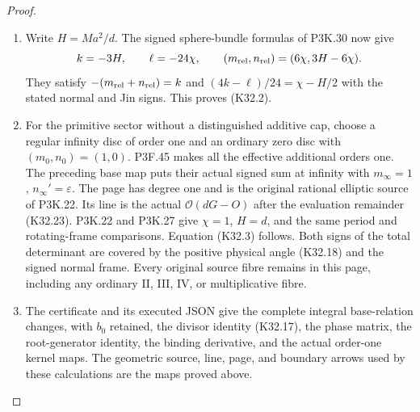 \begin{proof}
\begin{enumerate}[label=\arabic*.]
\item Write $H=Ma^2/d$. The signed sphere-bundle
formulas of P3K.30 now give
\[
 k=-3H,\qquad\ell=-24\chi,\qquad
 (m_{\rm rel},n_{\rm rel})=(6\chi,3H-6\chi).
\]
They satisfy $-(m_{\rm rel}+n_{\rm rel})=k$
and $(4k-\ell)/24=\chi-H/2$ with the stated
normal and Jin signs. This proves (K32.2).

\item For the primitive sector without a distinguished
additive cap, choose a regular infinity disc
of order one and an ordinary zero disc with
$(m_0,n_0)=(1,0)$. P3F.45 makes all the effective
additional orders one. The preceding base
map puts their actual signed sum at infinity
with $m_\infty=1$, $n_\infty'=\varepsilon$.
The page has degree one and is the original
rational elliptic source of P3K.22. Its line
is the actual $\mathcal O(dG-O)$ after the
evaluation remainder (K32.23). P3K.22 and
P3K.27 give $\chi=1$, $H=d$, and the same
period and rotating-frame comparisons.
Equation (K32.3) follows. Both signs of the
total determinant are covered by the positive
physical angle (K32.18) and the signed normal
frame. Every original source fibre remains
in this page, including any ordinary II,
III, IV, or multiplicative fibre.

\item The certificate
 and its
executed JSON give the complete integral
base-relation changes, with $b_0$ retained,
the divisor identity (K32.17), the phase
matrix, the root-generator identity, the
binding derivative, and the actual order-one
kernel maps. The geometric source, line,
page, and boundary arrows used by these
calculations are the maps proved above.

\end{enumerate}
\end{proof}